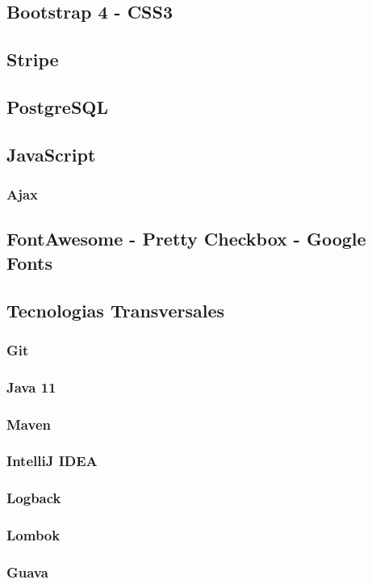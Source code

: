 \documentclass[a4paper]{report}
\begin{document}
    \subsection{Bootstrap 4 - CSS3}
    \subsection{Stripe}
    \subsection{PostgreSQL}
    \subsection{JavaScript}
    \subsubsection{Ajax}
    \subsection{FontAwesome - Pretty Checkbox - Google Fonts}
    \subsection{Tecnologias Transversales}
    \subsubsection{Git}
    \subsubsection{Java 11}
    \subsubsection{Maven}
    \subsubsection{IntelliJ IDEA}
    \subsubsection{Logback}
    \subsubsection{Lombok}
    \subsubsection{Guava}
\end{document}
